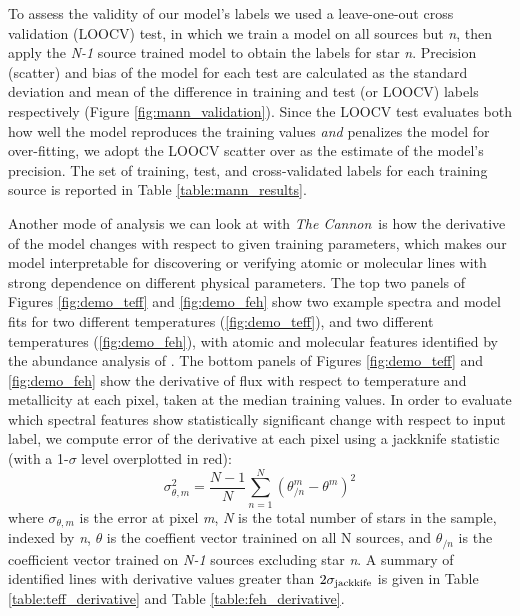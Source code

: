 \documentclass[twocolumn]{aastex62}
\newcommand{\thecannon}{\textsl{The Cannon}}
\begin{document}
To assess the validity of our model's labels we used a leave-one-out cross validation (LOOCV) test, in which we train a model on all sources but \emph{n}, then apply the \emph{N-1} source trained model to obtain the labels for star \emph{n}. Precision (scatter) and bias of the model for each test are calculated as the standard deviation and mean of the difference in training and test (or LOOCV) labels respectively (Figure \ref{fig:mann_validation}). Since the LOOCV test evaluates both how well the model reproduces the training values \emph{and} penalizes the model for over-fitting, we adopt the LOOCV scatter over as the estimate of the model's precision. The set of training, test, and cross-validated labels for each training source is reported in Table \ref{table:mann_results}.

Another mode of analysis we can look at with \thecannon\ is how the derivative of the model changes with respect to given training parameters, which makes our model interpretable for discovering or verifying atomic or molecular lines with strong dependence on different physical parameters. The top two panels of Figures \ref{fig:demo_teff} and \ref{fig:demo_feh} show two example spectra and model fits for two different temperatures (\ref{fig:demo_teff}), and two different temperatures (\ref{fig:demo_feh}), with atomic and molecular features identified by the abundance analysis of \citealt{Souto:2017}. The bottom panels of Figures \ref{fig:demo_teff} and \ref{fig:demo_feh} show the derivative of flux with respect to temperature and metallicity at each pixel, taken at the median training values. In order to evaluate which spectral features show statistically significant change with respect to input label, we compute error of the derivative at each pixel using a jackknife statistic (with a 1-$\sigma$ level overplotted in red):
\begin{equation}
	\sigma_{\theta,m}^2 = \frac{N-1}{N} \sum^N_{n=1} (\theta_{/n}^m - \theta^m)^2 
\end{equation}
where $\sigma_{\theta,m}$ is the error at pixel \emph{m}, \emph{N} is the total number of stars in the sample, indexed by \emph{n}, $\theta$ is the coeffient vector trainined on all N sources, and $\theta_{/n}$ is the coefficient vector trained on \emph{N-1} sources excluding star \emph{n}. A summary of identified lines with derivative values greater than $2\sigma_{\rm jackkife}$ is given in Table \ref{table:teff_derivative} and Table \ref{table:feh_derivative}.
\end{document}
